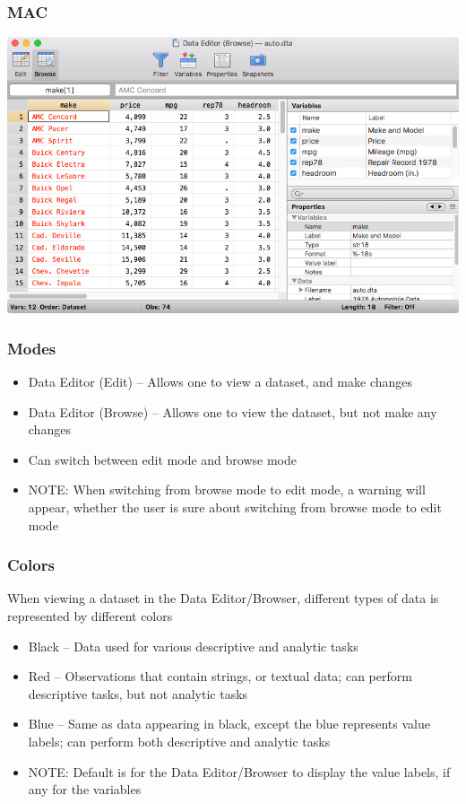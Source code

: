 \documentclass{beamer}
\begin{document}
\begin{frame}
	\frametitle{MAC}
		\includegraphics[scale=0.35]{data_editor_mac}
\end{frame}

\begin{frame}
	\frametitle{Modes}
		\begin{itemize}
			\item Data Editor (Edit) -- Allows one to view a dataset, and make changes
			\item Data Editor (Browse) -- Allows one to view the dataset, but not make any changes
			\item Can switch between edit mode and browse mode
			\item NOTE: When switching from browse mode to edit mode, a warning will appear, whether the user is sure about switching from browse mode to edit mode
		\end{itemize}
\end{frame}

\begin{frame}
	\frametitle{Colors}
		When viewing a dataset in the Data Editor/Browser, different types of data is represented by different colors
		\begin{itemize}
			\item Black -- Data used for various descriptive and analytic tasks
			\item Red -- Observations that contain strings, or textual data; can perform descriptive tasks, but not analytic tasks
			\item Blue -- Same as data appearing in black, except the blue represents value labels; can perform both descriptive and analytic tasks
			\item NOTE: Default is for the Data Editor/Browser to display the value labels, if any for the variables
		\end{itemize}
\end{frame}
\end{document}
